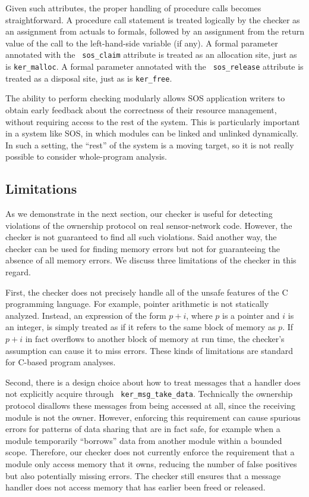 Given such attributes, the proper
handling of procedure calls becomes straightforward.  A procedure call
statement 
is treated logically by the checker
as an assignment from actuals to formals, followed by an
assignment from the return value of the call to the left-hand-side
variable (if any).  A formal parameter annotated with the {\tt
  sos\_claim} attribute is treated as an allocation site, just as is
{\tt ker\_malloc}.  A formal parameter annotated with the {\tt
  sos\_release} attribute is treated as a disposal site, just as is
{\tt ker\_free}.

The ability to perform checking modularly allows SOS application
writers to obtain early feedback about the correctness of their
resource management, without requiring access to the rest of the
system.  This is particularly important in a system like SOS, in which
modules can be linked and unlinked dynamically.  In such a setting,
the ``rest'' of the system is a moving target, so it is not really
possible to consider whole-program analysis.

\subsection{Limitations}

As we demonstrate in the next section,
our checker is useful for detecting violations of the ownership
protocol on real sensor-network code.
However, the checker is not guaranteed to find all such violations.
Said another way, the checker can be used for finding memory errors but not
for guaranteeing the absence of all memory errors.  We discuss three
limitations of the checker in this regard.

First, the checker does not precisely handle all of the unsafe features of the
C programming language.  For example, pointer arithmetic is not
statically analyzed.  Instead, an expression of the form $p+i$, where
$p$ is a pointer and $i$ is an integer, is simply treated as if it refers to
the same block of memory as $p$.  If $p+i$ in fact overflows to
another block of memory at run time, the checker's assumption can
cause it to miss errors.
These kinds of limitations are standard for C-based program analyses.

Second, there is a design choice about how to treat messages that a
handler does not explicitly acquire through {\tt
  ker\_msg\_take\_data}.  Technically the ownership protocol 
disallows these messages from being accessed at all, since the
receiving module
is not the owner.  However, enforcing this requirement can cause
spurious errors for patterns of data sharing that are in fact safe,
for example when a module temporarily ``borrows'' data from another
module within a bounded scope.  Therefore, our checker does not
currently enforce the requirement that a module only access memory
that it owns, reducing the number of false positives but also
potentially missing errors.  The checker still ensures that a message
handler does not access memory that has earlier been freed or released.

